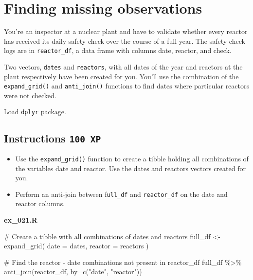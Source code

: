 \documentclass[
  letterpaper,
  DIV=11,
  numbers=noendperiod]{scrreprt}
\newenvironment{Shaded}{\begin{snugshade}}{\end{snugshade}}
\newcommand{\AttributeTok}[1]{\textcolor[rgb]{0.40,0.45,0.13}{#1}}
\newcommand{\CommentTok}[1]{\textcolor[rgb]{0.37,0.37,0.37}{#1}}
\newcommand{\FunctionTok}[1]{\textcolor[rgb]{0.28,0.35,0.67}{#1}}
\newcommand{\NormalTok}[1]{\textcolor[rgb]{0.00,0.23,0.31}{#1}}
\newcommand{\OtherTok}[1]{\textcolor[rgb]{0.00,0.23,0.31}{#1}}
\newcommand{\SpecialCharTok}[1]{\textcolor[rgb]{0.37,0.37,0.37}{#1}}
\newcommand{\StringTok}[1]{\textcolor[rgb]{0.13,0.47,0.30}{#1}}
\providecommand{\tightlist}{%
  \setlength{\itemsep}{0pt}\setlength{\parskip}{0pt}}\usepackage{longtable,booktabs,array}
\begin{document}
\hypertarget{finding-missing-observations}{%
\section{Finding missing
observations}\label{finding-missing-observations}}

You're an inspector at a nuclear plant and have to validate whether
every reactor has received its daily safety check over the course of a
full year. The safety check logs are in \texttt{reactor\_df}, a data
frame with columns date, reactor, and check.

Two vectors, \texttt{dates} and \texttt{reactors}, with all dates of the
year and reactors at the plant respectively have been created for you.
You'll use the combination of the \texttt{expand\_grid()} and
\texttt{anti\_join()} functions to find dates where particular reactors
were not checked.

Load \texttt{dplyr} package.

\hypertarget{instructions-100-xp-18}{%
\subsection*{\texorpdfstring{Instructions
\texttt{100\ XP}}{Instructions 100 XP}}\label{instructions-100-xp-18}}

\begin{itemize}
\tightlist
\item
  Use the \texttt{expand\_grid()} function to create a tibble holding
  all combinations of the variables date and reactor. Use the dates and
  reactors vectors created for you.
\item
  Perform an anti-join between f\texttt{ull\_df} and
  \texttt{reactor\_df} on the date and reactor columns.
\end{itemize}

\textbf{ex\_021.R}

\begin{Shaded}
\begin{Highlighting}[]
\CommentTok{\# Create a tibble with all combinations of dates and reactors}
\NormalTok{full\_df }\OtherTok{\textless{}{-}} \FunctionTok{expand\_grid}\NormalTok{(}
  \AttributeTok{date =}\NormalTok{ dates, }
  \AttributeTok{reactor =}\NormalTok{ reactors}
\NormalTok{)}

\CommentTok{\# Find the reactor {-} date combinations not present in reactor\_df}
\NormalTok{full\_df }\SpecialCharTok{\%\textgreater{}\%} 
  \FunctionTok{anti\_join}\NormalTok{(reactor\_df, }\AttributeTok{by=}\FunctionTok{c}\NormalTok{(}\StringTok{"date"}\NormalTok{, }\StringTok{"reactor"}\NormalTok{))}
\end{Highlighting}
\end{Shaded}
\end{document}
